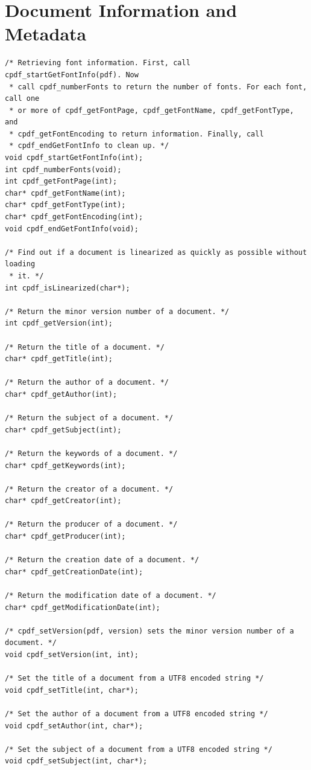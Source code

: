 \documentclass[a4paper]{memoir}
\begin{document}
\chapter{Document Information and Metadata}
\begin{small}
\begin{lstlisting}
/* Retrieving font information. First, call cpdf_startGetFontInfo(pdf). Now
 * call cpdf_numberFonts to return the number of fonts. For each font, call one
 * or more of cpdf_getFontPage, cpdf_getFontName, cpdf_getFontType, and
 * cpdf_getFontEncoding to return information. Finally, call
 * cpdf_endGetFontInfo to clean up. */
void cpdf_startGetFontInfo(int);
int cpdf_numberFonts(void);
int cpdf_getFontPage(int);
char* cpdf_getFontName(int);
char* cpdf_getFontType(int);
char* cpdf_getFontEncoding(int);
void cpdf_endGetFontInfo(void);

/* Find out if a document is linearized as quickly as possible without loading
 * it. */
int cpdf_isLinearized(char*);

/* Return the minor version number of a document. */
int cpdf_getVersion(int);

/* Return the title of a document. */
char* cpdf_getTitle(int);

/* Return the author of a document. */
char* cpdf_getAuthor(int);

/* Return the subject of a document. */
char* cpdf_getSubject(int);

/* Return the keywords of a document. */
char* cpdf_getKeywords(int);

/* Return the creator of a document. */
char* cpdf_getCreator(int);

/* Return the producer of a document. */
char* cpdf_getProducer(int);

/* Return the creation date of a document. */
char* cpdf_getCreationDate(int);

/* Return the modification date of a document. */
char* cpdf_getModificationDate(int);

/* cpdf_setVersion(pdf, version) sets the minor version number of a document. */
void cpdf_setVersion(int, int);

/* Set the title of a document from a UTF8 encoded string */
void cpdf_setTitle(int, char*);

/* Set the author of a document from a UTF8 encoded string */
void cpdf_setAuthor(int, char*);

/* Set the subject of a document from a UTF8 encoded string */
void cpdf_setSubject(int, char*);


\end{lstlisting}
\end{small}
\end{document}
